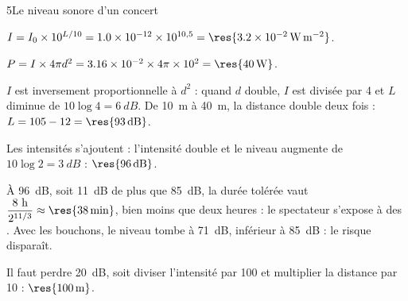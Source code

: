\begin{corrigeBac}{5}{Le niveau sonore d'un concert}
\begin{questions}
\item $I=I_0\times10^{L/10}=\num{1.0e-12}\times10^{10{,}5}=\res{\qty{3,2e-2}{W.m^{-2}}}$. 
\item $P=I\times4\pi d^2=\num{3.16e-2}\times4\pi\times10^2=\res{\qty{40}{W}}$. 
\item $I$ est inversement proportionnelle à $d^2$ : quand $d$ double, $I$ est divisée par 4 et $L$ diminue de $10\log4=\qty{6}{dB}$. De
\qty{10}{m} à \qty{40}{m}, la distance double deux fois : $L=105-12=\res{\qty{93}{dB}}$. \pts{1 pt}
\item Les intensités s'ajoutent : l'intensité double et le niveau augmente de $10\log2=\qty{3}{dB}$ : $\res{\qty{96}{dB}}$. 
\item À \qty{96}{dB}, soit \qty{11}{dB} de plus que \qty{85}{dB}, la durée tolérée vaut $\dfrac{8\ \mathrm{h}}{2^{11/3}}\approx\res{\qty{38}{min}}$, bien moins que deux heures :
le spectateur s'expose à des . Avec les bouchons, le niveau tombe à \qty{71}{dB}, inférieur à \qty{85}{dB} :
le risque disparaît. 
\item Il faut perdre \qty{20}{dB}, soit diviser l'intensité par 100 et multiplier la distance par 10 : $\res{\qty{100}{m}}$. 
\end{questions}
\end{corrigeBac}
